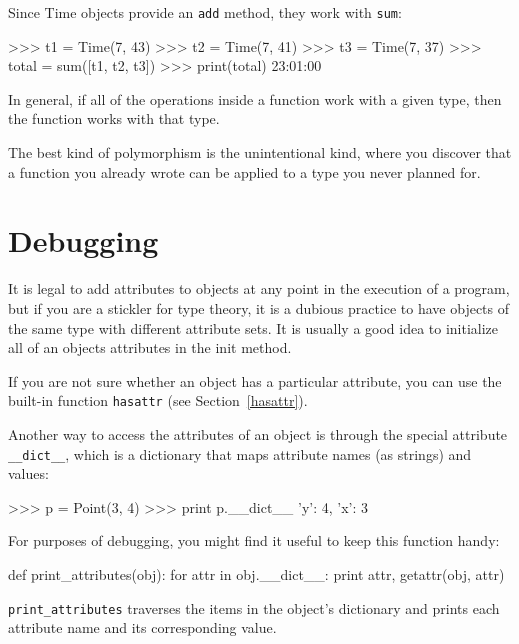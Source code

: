 
Since Time objects provide an {\tt add} method, they work
with {\tt sum}:

\beforeverb
\begin{pyinterpreter}
>>> t1 = Time(7, 43)
>>> t2 = Time(7, 41)
>>> t3 = Time(7, 37)
>>> total = sum([t1, t2, t3])
>>> print(total)
23:01:00
\end{pyinterpreter}
\afterverb
%
In general, if all of the operations inside a function 
work with a given type, then the function works with that type.

The best kind of polymorphism is the unintentional kind, where
you discover that a function you already wrote can be
applied to a type you never planned for.


\section{Debugging}

It is legal to add attributes to objects at any point in the execution
of a program, but if you are a stickler for type theory, it is a
dubious practice to have objects of the same type with different
attribute sets.  It is usually a good idea to
initialize all of an objects attributes in the init method.


If you are not sure whether an object has a particular attribute, you
can use the built-in function {\tt hasattr} (see Section~\ref{hasattr}).


Another way to access the attributes of an object is through the
special attribute \verb"__dict__", which is a dictionary that maps
attribute names (as strings) and values:

\beforeverb
\begin{pyinterpreter}
>>> p = Point(3, 4)
>>> print p.__dict__
{'y': 4, 'x': 3}
\end{pyinterpreter}
\afterverb
%
For purposes of debugging, you might find it useful to keep this
function handy:

\beforeverb
\begin{pycode}
def print_attributes(obj):
    for attr in obj.__dict__:
        print attr, getattr(obj, attr)
\end{pycode}
\afterverb
%
\verb"print_attributes" traverses the items in the object's dictionary
and prints each attribute name and its corresponding value.

